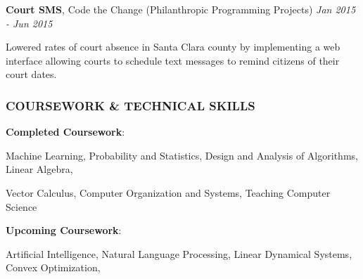 \documentclass[11pt,letterpaper]{article}%
\begin{document}
\vspace{-.3em}
\hspace{.6em}  
{\bf Court SMS}, Code the Change (Philanthropic Programming Projects) \hfill \textit{Jan 2015 - Jun 2015}
\vspace{-.4em}
\begin{itemize*}
\item Lowered rates of court absence in Santa Clara county by implementing a web interface allowing courts to schedule text messages to remind citizens of their court dates.
\end{itemize*}


\vspace{-.2em}
\subsubsection*{COURSEWORK \& TECHNICAL SKILLS}
\vspace{-2ex}
\hrulefill

\hspace{.6em} 
\textbf{Completed Coursework}: 

\hspace{2.4em}
Machine Learning,
Probability and Statistics, 
Design and Analysis of Algorithms, 
Linear Algebra,

\hspace{2.4em}
Vector Calculus,
Computer Organization and Systems, 
Teaching Computer Science

\hspace{.6em}
\textbf{Upcoming Coursework}:

\hspace{2.4em}
Artificial Intelligence, 
Natural Language Processing,
Linear Dynamical Systems,
Convex Optimization,
\end{document}
